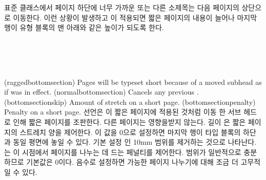 표준 클래스에서 페이지 하단에 너무 가까운 \cmd{\section} 또는 다른 소제목는 다음 페이지의 상단으로 이동한다.
이런 상황이 발생하고 \cmd{\flushbottom}이 적용되면 짧은 페이지의 내용이 늘어나 마지막 행이 유형 블록의 맨 아래와 같은 높이가 되도록 한다.
\begin{syntax}
\cmd{\raggedbottomsection} \\
\cmd{\normalbottomsection} \\
\lnc{\bottomsectionskip} \\
\cmd{\bottomsectionpenalty}
\end{syntax}
\glossary(raggedbottomsection)%
  {}%
  {Pages will be typeset short because of a moved subhead as if
    was in effect.}
\glossary(normalbottomsection)%
  {}%
  {Cancels any previous .}
\glossary(bottomsectionskip)%
  {}%
  {Amount of stretch on a  short page.}
\glossary(bottomsectionpenalty)%
  {}%
  {Penalty on a  short page.}
\cmd{\raggedbottomsection} 선언은 \cmd{\raggedbottom}이 짧은 페이지에 적용된 것처럼 이동 한 서브 헤드로 인해 짧은 페이지를 조판한다. 다른 페이지는 영향을받지 않는다.
길이 \lnc{\bottomsectionskip}은 짧은 페이지의 스트레치 양을 제어한다.
이 값을 0으로 설정하면 마지막 행이 타입 블록의 하단과 동일 평면에 놓일 수 있다. 기본 설정 인 10mm 범위를 제거하는 것으로 나타난다.
\cmd{\bottomsectionpenalty}는 이 시점에서 페이지를 나누는 데 드는 페널티를 제어한다.
범위가 일반적으로 충분하므로 기본값은 0이다. 음수로 설정하면 가능한 페이지 나누기에 대해 조금 더 고무적 일 수 있다.

